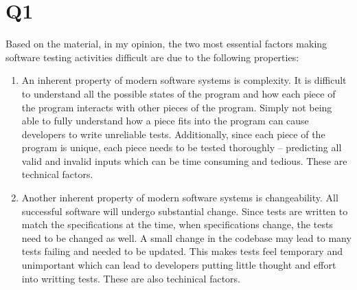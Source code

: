 \documentclass[12pt, letterpaper, titlepage]{article}
\begin{document}
 
\singlespacing

\section{Q1}
Based on the material, in my opinion, the two most essential factors making software testing activities difficult are due to the following properties:
\begin{enumerate}
    \item An inherent property of modern software systems is complexity. It is difficult to understand all the possible states of the program and how each piece of the program interacts with other pieces of the program. Simply not being able to fully understand how a piece fits into the program can cause developers to write unreliable tests. Additionally, since each piece of the program is unique, each piece needs to be tested thoroughly -- predicting all valid and invalid inputs which can be time consuming and tedious. These are technical factors.
    
    \item Another inherent property of modern software systems is changeability. All successful software will undergo substantial change. Since tests are written to match the specifications at the time, when specifications change, the tests need to be changed as well. A small change in the codebase may lead to many tests failing and needed to be updated. This makes tests feel temporary and unimportant which can lead to developers putting little thought and effort into writting tests. These are also techinical factors.

\end{enumerate}
\end{document}
